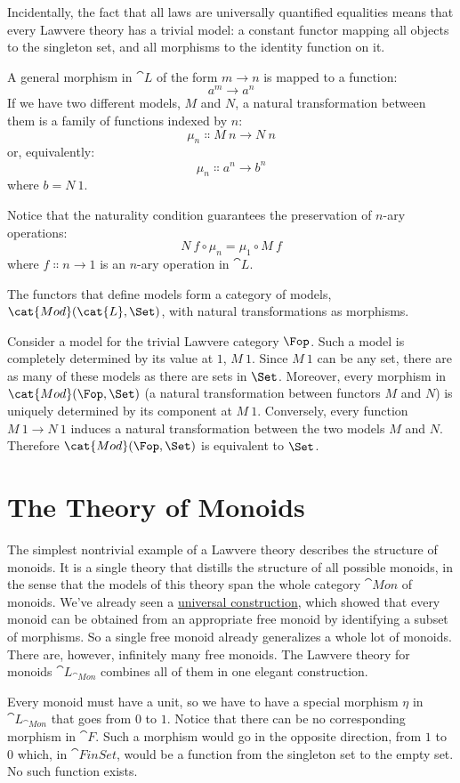 Incidentally, the fact that all laws are universally quantified
equalities means that every Lawvere theory has a trivial model: a
constant functor mapping all objects to the singleton set, and all morphisms
to the identity function on it.

A general morphism in $\cat{L}$ of the form
$m \to n$ is mapped to a function:
\[a^m \to a^n\]
If we have two different models, $M$ and $N$, a natural
transformation between them is a family of functions indexed by
$n$:
\[\mu_n \Colon M\ n \to N\ n\]
or, equivalently:
\[\mu_n \Colon a^n \to b^n\]
where $b = N\ 1$.

Notice that the naturality condition guarantees the preservation of
$n$-ary operations:
\[N\ f \circ \mu_n = \mu_1 \circ M\ f\]
where $f \Colon n \to 1$ is an $n$-ary operation in
$\cat{L}$.

The functors that define models form a category of models,
$\cat{Mod}(\cat{L}, \Set)$, with natural transformations as morphisms.

Consider a model for the trivial Lawvere category
$\Fop$. Such a model is completely determined by
its value at $1$, $M\ 1$. Since $M\ 1$ can be any
set, there are as many of these models as there are sets in
$\Set$. Moreover, every morphism in $\cat{Mod}(\Fop, \Set)$ (a
natural transformation between functors $M$ and $N$) is
uniquely determined by its component at $M\ 1$. Conversely, every
function $M\ 1 \to N\ 1$ induces a natural
transformation between the two models $M$ and $N$.
Therefore $\cat{Mod}(\Fop, \Set)$ is equivalent to $\Set$.

\section{The Theory of Monoids}

The simplest nontrivial example of a Lawvere theory describes the
structure of monoids. It is a single theory that distills the structure
of all possible monoids, in the sense that the models of this theory
span the whole category $\cat{Mon}$ of monoids. We've already seen a
\hyperref[free-monoids]{universal
construction}, which showed that every monoid can be obtained from an
appropriate free monoid by identifying a subset of morphisms. So a
single free monoid already generalizes a whole lot of monoids. There
are, however, infinitely many free monoids. The Lawvere theory for
monoids $\cat{L}_{\cat{Mon}}$ combines all of them in one
elegant construction.

Every monoid must have a unit, so we have to have a special morphism
$\eta$ in $\cat{L}_{\cat{Mon}}$ that goes from $0$ to
$1$. Notice that there can be no corresponding morphism in
$\cat{F}$. Such a morphism would go in the opposite direction, from
$1$ to $0$ which, in $\cat{FinSet}$, would be a function
from the singleton set to the empty set. No such function exists.

